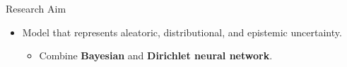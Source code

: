 \begin{frame}{Research Aim}
\label{frm:research-aim}
\begin{itemize}
\setlength{\itemsep}{8mm}
\item Model that represents aleatoric, distributional, and epistemic uncertainty. 
\begin{itemize}
\item Combine \textbf{Bayesian} and \textbf{Dirichlet neural network}.
\end{itemize}
\end{itemize}
\end{frame}
